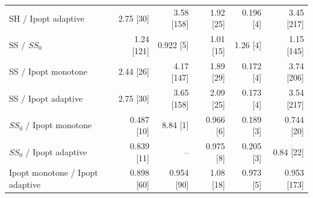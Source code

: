 \begin{tabular}{@{}lrrrrr@{}}
SH / Ipopt adaptive & 2.75 [30] & 3.58 [158] & 1.92 [25] & 0.196 [4] & 3.45 [217]\\
SS / $SS_0$ & 1.24 [121] & 0.922 [5] & 1.01 [15] & 1.26 [4] & 1.15 [145]\\
SS / Ipopt monotone & 2.44 [26] & 4.17 [147] & 1.89 [29] & 0.172 [4] & 3.74 [206]\\
SS / Ipopt adaptive & 2.75 [30] & 3.65 [158] & 2.09 [25] & 0.173 [4] & 3.54 [217]\\
$SS_0$ / Ipopt monotone & 0.487 [10] & 8.84 [1] & 0.966 [6] & 0.189 [3] & 0.744 [20]\\
$SS_0$ / Ipopt adaptive & 0.839 [11] & -- & 0.975 [8] & 0.205 [3] & 0.84 [22]\\
Ipopt monotone / Ipopt adaptive & 0.898 [60] & 0.954 [90] & 1.08 [18] & 0.973 [5] & 0.953 [173]\\
\bottomrule
\end{tabular}
